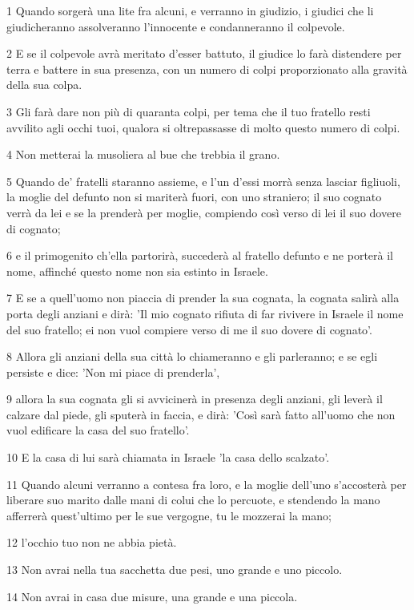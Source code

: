 \par 1 Quando sorgerà una lite fra alcuni, e verranno in giudizio, i giudici che li giudicheranno assolveranno l'innocente e condanneranno il colpevole.
\par 2 E se il colpevole avrà meritato d'esser battuto, il giudice lo farà distendere per terra e battere in sua presenza, con un numero di colpi proporzionato alla gravità della sua colpa.
\par 3 Gli farà dare non più di quaranta colpi, per tema che il tuo fratello resti avvilito agli occhi tuoi, qualora si oltrepassasse di molto questo numero di colpi.
\par 4 Non metterai la musoliera al bue che trebbia il grano.
\par 5 Quando de' fratelli staranno assieme, e l'un d'essi morrà senza lasciar figliuoli, la moglie del defunto non si mariterà fuori, con uno straniero; il suo cognato verrà da lei e se la prenderà per moglie, compiendo così verso di lei il suo dovere di cognato;
\par 6 e il primogenito ch'ella partorirà, succederà al fratello defunto e ne porterà il nome, affinché questo nome non sia estinto in Israele.
\par 7 E se a quell'uomo non piaccia di prender la sua cognata, la cognata salirà alla porta degli anziani e dirà: 'Il mio cognato rifiuta di far rivivere in Israele il nome del suo fratello; ei non vuol compiere verso di me il suo dovere di cognato'.
\par 8 Allora gli anziani della sua città lo chiameranno e gli parleranno; e se egli persiste e dice: 'Non mi piace di prenderla',
\par 9 allora la sua cognata gli si avvicinerà in presenza degli anziani, gli leverà il calzare dal piede, gli sputerà in faccia, e dirà: 'Così sarà fatto all'uomo che non vuol edificare la casa del suo fratello'.
\par 10 E la casa di lui sarà chiamata in Israele 'la casa dello scalzato'.
\par 11 Quando alcuni verranno a contesa fra loro, e la moglie dell'uno s'accosterà per liberare suo marito dalle mani di colui che lo percuote, e stendendo la mano afferrerà quest'ultimo per le sue vergogne, tu le mozzerai la mano;
\par 12 l'occhio tuo non ne abbia pietà.
\par 13 Non avrai nella tua sacchetta due pesi, uno grande e uno piccolo.
\par 14 Non avrai in casa due misure, una grande e una piccola.
